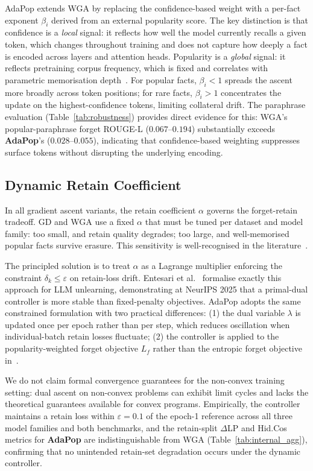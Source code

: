 AdaPop extends WGA by replacing the confidence-based weight with a per-fact exponent $\beta_i$ derived from an external popularity score. The key distinction is that confidence is a \emph{local} signal: it reflects how well the model currently recalls a given token, which changes throughout training and does not capture how deeply a fact is encoded across layers and attention heads. Popularity is a \emph{global} signal: it reflects pretraining corpus frequency, which is fixed and correlates with parametric memorisation depth~\cite{hartmann2024undesirable, kandpal2023large}. For popular facts, $\beta_i < 1$ spreads the ascent more broadly across token positions; for rare facts, $\beta_i > 1$ concentrates the update on the highest-confidence tokens, limiting collateral drift. The paraphrase evaluation (Table~\ref{tab:robustness}) provides direct evidence for this: WGA's popular-paraphrase forget ROUGE-L ($0.067$--$0.194$) substantially exceeds \textbf{AdaPop}'s ($0.028$--$0.055$), indicating that confidence-based weighting suppresses surface tokens without disrupting the underlying encoding.

\subsection{Dynamic Retain Coefficient}

In all gradient ascent variants, the retain coefficient $\alpha$ governs the forget-retain tradeoff. GD and WGA use a fixed $\alpha$ that must be tuned per dataset and model family: too small, and retain quality degrades; too large, and well-memorised popular facts survive erasure. This sensitivity is well-recognised in the literature~\cite{bu2025unlearning}.

The principled solution is to treat $\alpha$ as a Lagrange multiplier enforcing the constraint $\delta_k \le \varepsilon$ on retain-loss drift. Entesari et al.~\cite{entesariconstrained} formalise exactly this approach for LLM unlearning, demonstrating at NeurIPS 2025 that a primal-dual controller is more stable than fixed-penalty objectives. AdaPop adopts the same constrained formulation with two practical differences: (1) the dual variable $\lambda$ is updated once per epoch rather than per step, which reduces oscillation when individual-batch retain losses fluctuate; (2) the controller is applied to the popularity-weighted forget objective $L_f$ rather than the entropic forget objective in~\cite{entesariconstrained}.

We do not claim formal convergence guarantees for the non-convex training setting: dual ascent on non-convex problems can exhibit limit cycles and lacks the theoretical guarantees available for convex programs. Empirically, the controller maintains a retain loss within $\varepsilon{=}0.1$ of the epoch-1 reference across all three model families and both benchmarks, and the retain-split $\Delta$LP and Hid.Cos metrics for \textbf{AdaPop} are indistinguishable from WGA (Table~\ref{tab:internal_agg}), confirming that no unintended retain-set degradation occurs under the dynamic controller.

